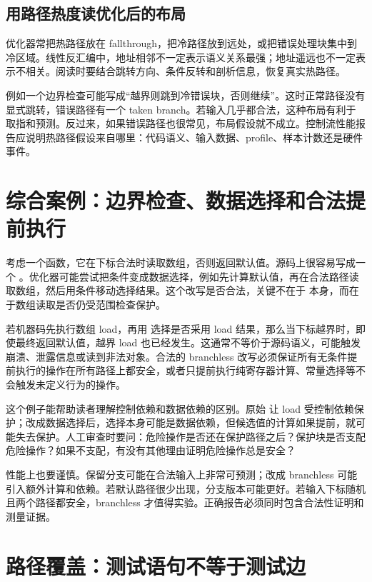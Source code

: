 \subsection{用路径热度读优化后的布局}

优化器常把热路径放在 fallthrough，把冷路径放到远处，或把错误处理块集中到冷区域。线性反汇编中，地址相邻不一定表示语义关系最强；地址遥远也不一定表示不相关。阅读时要结合跳转方向、条件反转和剖析信息，恢复真实热路径。

例如一个边界检查可能写成“越界则跳到冷错误块，否则继续”。这时正常路径没有显式跳转，错误路径有一个 taken branch。若输入几乎都合法，这种布局有利于取指和预测。反过来，如果错误路径也很常见，布局假设就不成立。控制流性能报告应说明热路径假设来自哪里：代码语义、输入数据、profile、样本计数还是硬件事件。

\section{综合案例：边界检查、数据选择和合法提前执行}

考虑一个函数，它在下标合法时读取数组，否则返回默认值。源码上很容易写成一个 。优化器可能尝试把条件变成数据选择，例如先计算默认值，再在合法路径读取数组，然后用条件移动选择结果。这个改写是否合法，关键不在于  本身，而在于数组读取是否仍受范围检查保护。

若机器码先执行数组 load，再用  选择是否采用 load 结果，那么当下标越界时，即使最终返回默认值，越界 load 也已经发生。这通常不等价于源码语义，可能触发崩溃、泄露信息或读到非法对象。合法的 branchless 改写必须保证所有无条件提前执行的操作在所有路径上都安全，或者只提前执行纯寄存器计算、常量选择等不会触发未定义行为的操作。

这个例子能帮助读者理解控制依赖和数据依赖的区别。原始  让 load 受控制依赖保护；改成数据选择后，选择本身可能是数据依赖，但候选值的计算如果提前，就可能失去保护。人工审查时要问：危险操作是否还在保护路径之后？保护块是否支配危险操作？如果不支配，有没有其他理由证明危险操作总是安全？

性能上也要谨慎。保留分支可能在合法输入上非常可预测；改成 branchless 可能引入额外计算和依赖。若默认路径很少出现，分支版本可能更好。若输入下标随机且两个路径都安全，branchless 才值得实验。正确报告必须同时包含合法性证明和测量证据。

\section{路径覆盖：测试语句不等于测试边}

